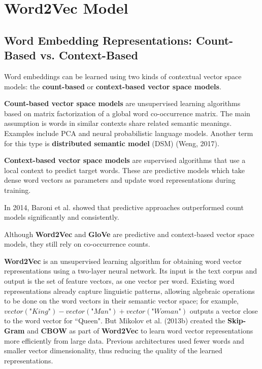 \section{Word2Vec Model}

\subsection{Word Embedding Representations: Count-Based vs. Context-Based}
 
Word embeddings can be learned using two kinds of contextual vector space models: the \textbf{count-based} or \textbf{context-based vector space models}. 

\textbf{Count-based vector space models} are unsupervised learning algorithms based on matrix factorization of a global word co-occurrence matrix. The main assumption is words in similar contexts share related semantic meanings. Examples include PCA and neural probabilistic language models. Another term for this type is \textbf{distributed semantic model} (DSM) (Weng, 2017). 

\textbf{Context-based vector space models} are supervised algorithms that use a local context to predict target words. These are predictive models which take dense word vectors as parameters and update word representations during training.

In 2014, Baroni et al. showed that predictive approaches outperformed count models significantly and consistently. 

Although \textbf{Word2Vec} and \textbf{GloVe} are predictive and context-based vector space models, they still rely on co-occurrence counts. 

\textbf{Word2Vec} is an unsupervised learning algorithm for obtaining word vector representations using a two-layer neural network. Its input is the text corpus and output is the set of feature vectors, as one vector per word. Existing word representations already capture linguistic patterns, allowing algebraic operations to be done on the word vectors in their semantic vector space; for example, $vector(\textit{"King"}) - vector(\textit{"Man"}) + vector(\textit{"Woman"})$ outputs a vector close to the word vector for ``Queen". But Mikolov et al. (2013b) created the \textbf{Skip-Gram} and \textbf{CBOW} as part of \textbf{Word2Vec} to learn word vector representations more efficiently from large data. Previous architectures used fewer words and smaller vector dimensionality, thus reducing the quality of the learned representations. 

